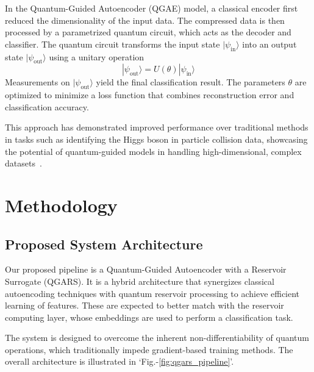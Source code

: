 \documentclass[conference]{IEEEtran}
\begin{document}
In the Quantum-Guided Autoencoder (QGAE) model, a 
classical encoder first reduced the dimensionality
of the input data. The compressed data is then processed 
by a parametrized quantum circuit, which acts as the decoder
and classifier. The quantum circuit transforms the 
input state \( |\psi_{\text{in}}\rangle \) into an
output state \( |\psi_{\text{out}}\rangle \) using a unitary operation
\begin{equation}
    |\psi_{\text{out}}\rangle = U(\theta) |\psi_{\text{in}}\rangle
\end{equation}
Measurements on \( |\psi_{\text{out}}\rangle \) yield the final
classification result. The parameters \( \theta \) are
optimized to minimize a loss function that combines
reconstruction error and classification accuracy.


This approach has demonstrated improved performance 
over traditional methods in tasks such as identifying 
the Higgs boson in particle collision data, 
showcasing the potential of quantum-guided models in 
handling high-dimensional, complex datasets~\cite{belisGuidedQuantumCompression2024}.

\section{Methodology}
\subsection{Proposed System Architecture}
Our proposed pipeline is a Quantum-Guided Autoencoder with a 
Reservoir Surrogate (QGARS). It is a hybrid architecture that 
synergizes classical autoencoding techniques with quantum reservoir processing to achieve efficient learning of features. These are expected to better match with the reservoir computing layer, whose embeddings are used to perform a classification task.

The system is designed to overcome the inherent non-differentiability of quantum operations, which traditionally impede gradient-based training methods.
The overall architecture is illustrated in `Fig.-\ref{fig:qgars_pipeline}'.
\end{document}

